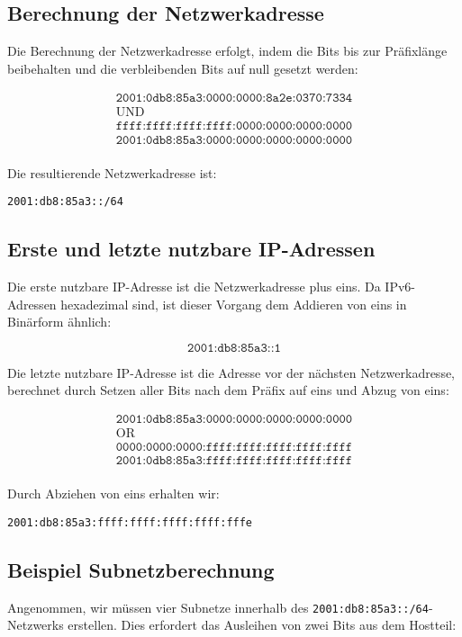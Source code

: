 \documentclass{article}
\begin{document}
\subsection*{Berechnung der Netzwerkadresse}
Die Berechnung der Netzwerkadresse erfolgt, indem die Bits bis zur Präfixlänge beibehalten und die verbleibenden Bits auf null gesetzt werden:

\[
\begin{array}{c}
\texttt{2001:0db8:85a3:0000:0000:8a2e:0370:7334} \\
\text{UND} \\
\texttt{ffff:ffff:ffff:ffff:0000:0000:0000:0000} \\
\hline
\texttt{2001:0db8:85a3:0000:0000:0000:0000:0000} \\
\end{array}
\]

Die resultierende Netzwerkadresse ist:

\texttt{2001:db8:85a3::/64}

\subsection*{Erste und letzte nutzbare IP-Adressen}

Die erste nutzbare IP-Adresse ist die Netzwerkadresse plus eins. Da IPv6-Adressen hexadezimal sind, ist dieser Vorgang dem Addieren von eins in Binärform ähnlich:

\[
\texttt{2001:db8:85a3::1}
\]

Die letzte nutzbare IP-Adresse ist die Adresse vor der nächsten Netzwerkadresse, berechnet durch Setzen aller Bits nach dem Präfix auf eins und Abzug von eins:

\[
\begin{array}{c}
\texttt{2001:0db8:85a3:0000:0000:0000:0000:0000} \\
\text{OR} \\
\texttt{0000:0000:0000:ffff:ffff:ffff:ffff:ffff} \\
\hline
\texttt{2001:0db8:85a3:ffff:ffff:ffff:ffff:ffff} \\
\end{array}
\]

Durch Abziehen von eins erhalten wir:

\texttt{2001:db8:85a3:ffff:ffff:ffff:ffff:fffe}

\subsection*{Beispiel Subnetzberechnung}
Angenommen, wir müssen vier Subnetze innerhalb des \texttt{2001:db8:85a3::/64}-Netzwerks erstellen. Dies erfordert das Ausleihen von zwei Bits aus dem Hostteil:
\end{document}
